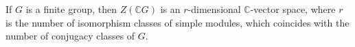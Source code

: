 If $G$ is a finite group, then $Z(\mathbb{C}G)$ is an $r$-dimensional $\mathbb{C}$-vector
space, where $r$ is the number of isomorphism classes of simple modules, which
coincides with the number of conjugacy classes of $G$.
